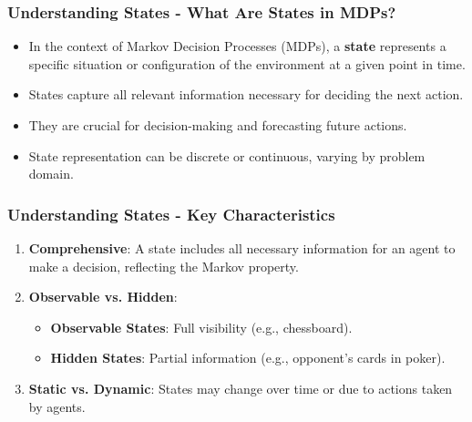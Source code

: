 \documentclass[aspectratio=169]{beamer}
\begin{document}
\begin{frame}[fragile]
    \frametitle{Understanding States - What Are States in MDPs?}
    \begin{itemize}
        \item In the context of Markov Decision Processes (MDPs), a \textbf{state} represents a specific situation or configuration of the environment at a given point in time.
        \item States capture all relevant information necessary for deciding the next action.
        \item They are crucial for decision-making and forecasting future actions.
        \item State representation can be discrete or continuous, varying by problem domain.
    \end{itemize}
\end{frame}

\begin{frame}[fragile]
    \frametitle{Understanding States - Key Characteristics}
    \begin{enumerate}
        \item \textbf{Comprehensive}: A state includes all necessary information for an agent to make a decision, reflecting the Markov property.
        \item \textbf{Observable vs. Hidden}:
        \begin{itemize}
            \item \textbf{Observable States}: Full visibility (e.g., chessboard).
            \item \textbf{Hidden States}: Partial information (e.g., opponent's cards in poker).
        \end{itemize}
        \item \textbf{Static vs. Dynamic}: States may change over time or due to actions taken by agents.
    \end{enumerate}
\end{frame}
\end{document}
